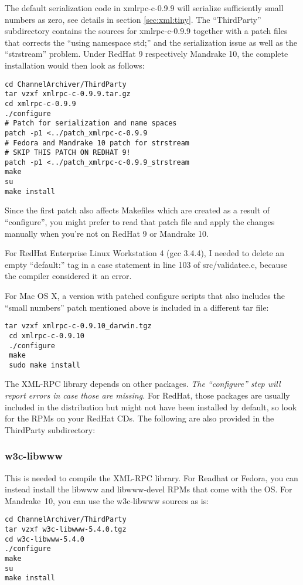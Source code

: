 \NOTE The default serialization code in xmlrpc-c-0.9.9 will serialize
sufficiently small numbers as zero, see details in section \ref{sec:xml:tiny}.
The ``ThirdParty'' subdirectory contains the sources for xmlrpc-c-0.9.9
together with a patch files that corrects the ``using namespace std;'' and
the serialization issue as well as the ``strstream'' problem.
Under RedHat 9 respectively Mandrake 10, the complete installation would
then look as follows:

\begin{lstlisting}[keywordstyle=\sffamily]
cd ChannelArchiver/ThirdParty
tar vzxf xmlrpc-c-0.9.9.tar.gz
cd xmlrpc-c-0.9.9
./configure
# Patch for serialization and name spaces
patch -p1 <../patch_xmlrpc-c-0.9.9
# Fedora and Mandrake 10 patch for strstream
# SKIP THIS PATCH ON REDHAT 9!
patch -p1 <../patch_xmlrpc-c-0.9.9_strstream
make
su
make install
\end{lstlisting}

\noindent Since the first patch also affects Makefiles which are
created as a result of ``configure'', you might prefer to read that
patch file and apply the changes manually when you're not on RedHat 9
or Mandrake 10.

For RedHat Enterprise Linux Workstation 4 (gcc 3.4.4),
I needed to delete an empty ``default:'' tag in a case statement
in line 103 of src/validatee.c, because the compiler considered
it an error.

For Mac OS X, a version with patched configure scripts
\cite{darwinports} that also includes the ``small numbers'' patch
mentioned above is included in a different tar file:
\begin{lstlisting}[keywordstyle=\sffamily]
 tar vzxf xmlrpc-c-0.9.10_darwin.tgz
 cd xmlrpc-c-0.9.10
 ./configure 
 make
 sudo make install
\end{lstlisting}

The XML-RPC library depends on other packages. \emph{The ``configure''
step will report errors in case those are missing.} For RedHat, those
packages are usually included in the distribution but might not have
been installed by default, so look for the RPMs on your RedHat CDs.
The following are also provided in the ThirdParty subdirectory:

\subsubsection{w3c-libwww}
This is needed to compile the XML-RPC library.
For Readhat or Fedora, you can instead install the libwww
and libwww-devel RPMs that come with the OS.
For Mandrake~10, you can use the w3c-libwww sources as is:
\begin{lstlisting}[keywordstyle=\sffamily]
cd ChannelArchiver/ThirdParty
tar vzxf w3c-libwww-5.4.0.tgz
cd w3c-libwww-5.4.0
./configure
make
su
make install
\end{lstlisting}

